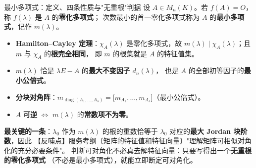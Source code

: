
\begin{fdeep}{最小多项式：定义、四条性质与"无重根"判据}
设 $A\in M_n(K)$。若 $f(A)=O$，称 $f(\lambda)$ 是 $A$ 的\textbf{零化多项式}；
次数最小的首一零化多项式称为 $A$ 的\textbf{最小多项式}，记作 $m(\lambda)$。
\begin{itemize}[leftmargin=1.8em,itemsep=0.15em]
\item \textbf{Hamilton--Cayley 定理}：$\chi_A(\lambda)$ 是零化多项式，故
      $m(\lambda)\mid\chi_A(\lambda)$；且 $m$ 与 $\chi_A$ 的\textbf{根完全相同}，
      即 $m$ 的根集就是 $A$ 的特征值集。
\item $m(\lambda)$ 恰是 $\lambda E-A$ 的\textbf{最大不变因子} $d_n(\lambda)$，
      也是 $A$ 的全部初等因子的\textbf{最小公倍式}。
\item \textbf{分块对角阵}：$m_{\operatorname{diag}(A_1,\dots,A_s)}
      =\bigl[m_{A_1},\dots,m_{A_s}\bigr]$（最小公倍式）。
\item $A$ \textbf{可逆} $\iff$ $m(\lambda)$ 的\textbf{常数项不为零}。
\end{itemize}
\textbf{最关键的一条}：$\lambda_0$ 作为 $m(\lambda)$ 的根的重数恰等于
$\lambda_0$ 对应的\textbf{最大 Jordan 块阶数}，因此
【反哺点】服务考纲〔矩阵的特征值和特征向量〕"理解矩阵可相似对角化的充分必要条件"。
判断可对角化不必真去解特征向量：只要写得出一个\textbf{无重根的零化多项式}
（不必是最小多项式），就能立即断定可对角化。
\end{fdeep}

